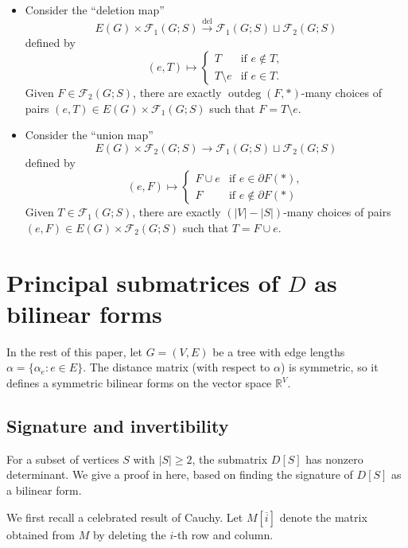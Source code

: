 \documentclass[12pt]{amsart}
\theoremstyle{definition}
\newcommand{\RR}{\mathbb{R}}
\newcommand{\trees}{\mathcal{F}_1}
\newcommand{\forests}{\mathcal{F}}
\DeclareMathOperator{\outdeg}{outdeg}
\begin{document}
\begin{itemize}[leftmargin=*]
\item Consider the ``deletion map''
\[
	E(G) \times \trees(G;S) \xrightarrow{\mathrm{del}} \trees(G;S) \sqcup \forests_2(G;S)
\]
defined by
\[
	(e, T) \mapsto \begin{cases}
	T &\text{if } e\not\in T,\\
	T \setminus e &\text{if } e\in T.
	\end{cases}
\]
Given $F \in \forests_2(G;S)$,
there are exactly $\outdeg(F, *)$-many choices of pairs $(e, T) \in E(G) \times \trees(G;S)$ such that $F = T \setminus e$.
\medskip
\item Consider the ``union map'' 
\[
	E(G) \times \forests_2(G;S) \longrightarrow \trees(G;S) \sqcup \forests_2(G;S)
\]
defined by
\[
	(e, F) \mapsto \begin{cases}
		F \cup e &\text{if } e \in \partial F(*), \\
		F &\text{if } e \not\in \partial F(*)
	\end{cases}
\]
Given $T \in \trees(G; S)$,  
there are exactly $(|V| - |S|)$-many choices of pairs $(e, F) \in E(G) \times \forests_2(G; S)$ such that $T = F \cup e$.
\end{itemize}



\section{Principal submatrices of \texorpdfstring{$D$}{D} as bilinear forms}
\label{sec:distance_prelim}

In the rest of this paper, let $G = (V, E)$ be a tree with edge lengths $\alpha = \{\alpha_e \colon e\in E\}$. The {distance matrix} (with respect to $\alpha$) is symmetric, so it defines a symmetric bilinear forms on the vector space $\RR^V$.


\subsection{Signature and invertibility}\label{sec:signature}

For a subset of vertices $S$ with $|S| \geq 2$, the submatrix $D[S]$ has nonzero determinant. 
We give a proof in here, based on finding the signature of $D[S]$ as a bilinear form.

We first recall a celebrated result of Cauchy.
Let $M[\overline{i}]$ denote the matrix obtained from $M$ by deleting the $i$-th row and column.
\end{document}

